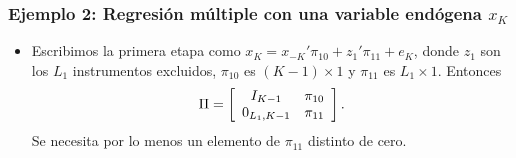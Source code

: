 \documentclass[t, compress, spanish, aspectratio=169]{beamer}
\begin{document}
\begin{frame}
    \frametitle{Ejemplo 2: Regresi\'on m\'ultiple con una variable end\'ogena $x_K$}
    \begin{itemize}
         \item  Escribimos la primera etapa como $x_{K}=x_{-K}'\pi_{10}+z_1'\pi_{11}+e_K$, donde $z_1$ son los $L_1$ instrumentos excluidos, $\pi_{10}$ es $(K-1)\times 1$ y $\pi_{11}$ es $L_1\times 1$. Entonces
        \begin{align*}
            \Pi = \left[ 
            \begin{array} {c c}
                I_{K-1} & \pi_{10}\\
                0_{L_1,K-1} & \pi_{11}
            \end{array}
            \right].
        \end{align*}
        Se necesita por lo menos un elemento de $\pi_{11}$ distinto de cero.
    \end{itemize}
\end{frame}
\end{document}

